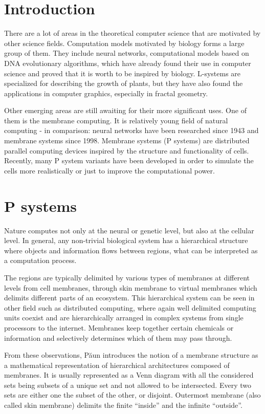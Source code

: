 \documentclass[a4paper,12pt,oneside,openany]{article}
\begin{document}


\section*{Introduction}
There are a lot of areas in the theoretical computer science that are
motivated by other science fields. Computation models motivated by
biology forms a large group of them. They include neural networks,
computational models based on DNA evolutionary algorithms, which
have already found their use in computer science and proved that it is
worth to be inspired by biology. L-systems are specialized for describing
the growth of plants, but they have also found the applications in
computer graphics, especially in fractal geometry.

Other emerging areas are still awaiting for their more significant uses.
One of them is the membrane computing. It is relatively young field of
natural computing - in comparison: neural networks have been
researched since 1943 and membrane systems since 1998. Membrane
systems (P systems) are distributed parallel computing devices inspired
by the structure and functionality of cells. Recently, many P system
variants have been developed in order to simulate the cells more
realistically or just to improve the computational power.

\section*{P systems}
Nature computes not only at the neural or genetic level, but also at the
cellular level. In general, any non-trivial biological system has a
hierarchical structure where objects and information flows between
regions, what can be interpreted as a computation process.

The regions are typically delimited by various types of membranes at
different levels from cell membranes, through skin membrane to virtual
membranes which delimits different parts of an ecosystem. This
hierarchical system can be seen in other field such as distributed
computing, where again well delimited computing units coexist and are
hierarchically arranged in complex systems from single processors to the
internet. Membranes keep together certain chemicals or information and
selectively determines which of them may pass through.

From these observations, Păun introduces the notion of a membrane
structure as a mathematical representation of hierarchical architectures
composed of membranes. It is usually represented as a Venn diagram
with all the considered sets being subsets of a unique set and not
allowed to be intersected. Every two sets are either one the subset of the
other, or disjoint. Outermost membrane (also called skin membrane)
delimits the finite “inside” and the infinite “outside”.
\end{document}

